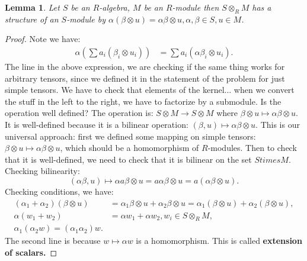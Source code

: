 \documentclass[12pt]{amsbook}
\theoremstyle{plain}
\numberwithin{section}{chapter}
\numberwithin{equation}{chapter}
\newtheorem{lem}[theorem]{Lemma}
\theoremstyle{definition}
\theoremstyle{remark}
\newcommand{\bee}{\begin{equation}\begin{aligned}}
\newcommand{\eee}{\end{aligned}\end{equation}}
\newcommand{\tens}{\otimes}
\begin{document}
\begin{lem}
Let $S$ be an $R$-algebra, $M$ be an $R$-module then $S \tens_R M$ has a structure of an $S$-module by $\alpha(\beta \tens u) = \alpha \beta \tens u, \alpha,\beta \in S,u \in M$. 
\end{lem}

\begin{proof}
Note we have: 
\bee
\alpha\left( \sum a_i(\beta_i \tens u_i)\right) &= \sum a_i ( \alpha \beta_i \tens u_i).
\eee
The line in the above expression, we are checking if the same thing works for arbitrary tensors, since we defined it in the statement of the problem for just simple tensors. We have to check that elements of the kernel... when we convert the stuff in the left to the right, we have to factorize by a submodule. Is the operation well defined? The operation is: $S \tens M \to S \tens M$ where $\beta \tens u \mapsto \alpha \beta \tens u$. It is well-defined because it is a bilinear operation: $(\beta,u) \mapsto \alpha\beta \tens u$. This is our universal approach: first we defined some mapping on simple tensors: $\beta \tens u \mapsto \alpha \beta \tens u$, which should be a homomorphism of $R$-modules. Then to check that it is well-defined, we need to check that it is bilinear on the set $S times M$. Checking bilinearity: 
$$
(\alpha \beta, u) \mapsto \alpha a \beta \tens u = a \alpha \beta \tens u = a(\alpha \beta \tens u).
$$
Checking conditions, we have: 
\bee
(\alpha_1 + \alpha_2)(\beta \tens u) &= \alpha_1 \beta \tens u + \alpha_2 \beta \tens u = \alpha_1(\beta \tens u) + \alpha_2(\beta \tens u),\\
\alpha(w_1 + w_2) &= \alpha w_1 + \alpha w_2,w_i \in S \tens_R M,\\
\alpha_1(\alpha_2w) = (\alpha_1 \alpha_2)w.
\eee
The second line is because $w \mapsto \alpha w$ is a homomorphism. This is called \textbf{extension of scalars. }
\end{proof}
\end{document}
